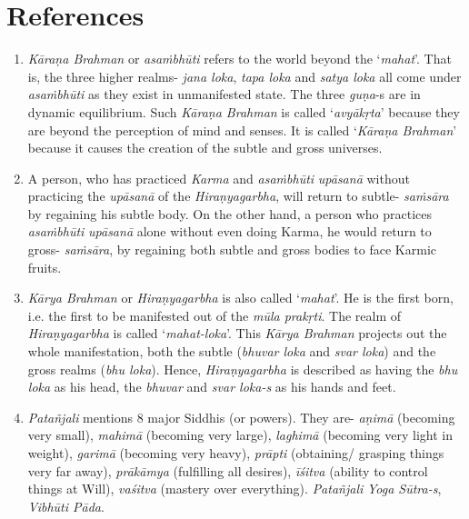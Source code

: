 \section*{References}

\begin{enumerate}
\itemsep=0pt
\item
  \emph{Kāraṇa Brahman} or \emph{asaṁbhūti} refers to the world beyond the `\emph{mahat}'. That is, the three higher realms- \emph{jana loka}, \emph{tapa loka} and \emph{satya loka} all come under \emph{asaṁbhūti} as they exist in unmanifested state. The three \emph{guṇa}-s are in dynamic equilibrium. Such \emph{Kāraṇa Brahman} is called `\emph{avyākṛta}' because they are beyond the perception of mind and senses. It is called `\emph{Kāraṇa Brahman}' because it causes the creation of the subtle and gross universes.
\item
  A person, who has practiced \emph{Karma} and \emph{asaṁbhūti} \emph{upāsanā} without practicing the \emph{upāsanā} of the \emph{Hiraṇyagarbha}, will return to subtle- \emph{saṁsāra} by regaining his subtle body. On the other hand, a person who practices \emph{asaṁbhūti} \emph{upāsanā} alone without even doing Karma, he would return to gross- \emph{saṁsāra}, by regaining both subtle and gross bodies to face Karmic fruits.
\item
  \emph{Kārya Brahman} or \emph{Hiraṇyagarbha} is also called `\emph{mahat}'. He is the first born, i.e. the first to be manifested out of the \emph{mūla prakṛti}. The realm of \emph{Hiraṇyagarbha} is called `\emph{mahat-loka}'. This \emph{Kārya Brahman} projects out the whole manifestation, both the subtle (\emph{bhuvar loka} and \emph{svar loka}) and the gross realms (\emph{bhu loka}). Hence, \emph{Hiraṇyagarbha} is described as having the \emph{bhu loka} as his head, the \emph{bhuvar} and \emph{svar loka-s} as his hands and feet.
\item
  \emph{Patañjali} mentions 8 major Siddhis (or powers). They are- \emph{aṇimā} (becoming very small), \emph{mahimā} (becoming very large), \emph{laghimā} (becoming very light in weight), \emph{garimā} (becoming very heavy), \emph{prāpti} (obtaining/ grasping things very far away), \emph{prākāmya} (fulfilling all desires), \emph{īśitva} (ability to control things at Will), \emph{vaśitva} (mastery over everything). \emph{Patañjali} \emph{Yoga Sūtra-s}, \emph{Vibhūti Pāda}.
\end{enumerate}


